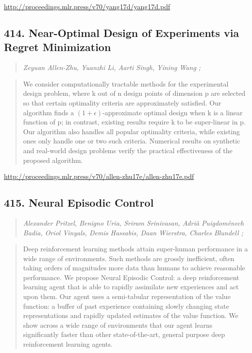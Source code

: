 \documentclass{article}
\begin{document}
\href{http://proceedings.mlr.press/v70/yang17d/yang17d.pdf}{http://proceedings.mlr.press/v70/yang17d/yang17d.pdf}

\subsection{414. Near-Optimal Design of Experiments via Regret Minimization}

\begin{quote}
\footnotesize{\textit{Zeyuan Allen-Zhu, Yuanzhi Li, Aarti Singh, Yining Wang ;}}
\end{quote}

\begin{quote}
    We consider computationally tractable methods for the experimental design problem, where k out of n design points of dimension p are selected so that certain optimality criteria are approximately satisfied. Our algorithm finds a $(1+\epsilon)$-approximate optimal design when k is a linear function of p; in contrast, existing results require k to be super-linear in p. Our algorithm also handles all popular optimality criteria, while existing ones only handle one or two such criteria. Numerical results on synthetic and real-world design problems verify the practical effectiveness of the proposed algorithm.  \end{quote}

\href{http://proceedings.mlr.press/v70/allen-zhu17e/allen-zhu17e.pdf}{http://proceedings.mlr.press/v70/allen-zhu17e/allen-zhu17e.pdf}

\subsection{415. Neural Episodic Control}

\begin{quote}
\footnotesize{\textit{Alexander Pritzel, Benigno Uria, Sriram Srinivasan, Adrià Puigdomènech Badia, Oriol Vinyals, Demis Hassabis, Daan Wierstra, Charles Blundell ;}}
\end{quote}

\begin{quote}
    Deep reinforcement learning methods attain super-human performance in a wide range of environments. Such methods are grossly inefficient, often taking orders of magnitudes more data than humans to achieve reasonable performance. We propose Neural Episodic Control: a deep reinforcement learning agent that is able to rapidly assimilate new experiences and act upon them. Our agent uses a semi-tabular representation of the value function: a buffer of past experience containing slowly changing state representations and rapidly updated estimates of the value function. We show across a wide range of environments that our agent learns significantly faster than other state-of-the-art, general purpose deep reinforcement learning agents.  \end{quote}
\end{document}
